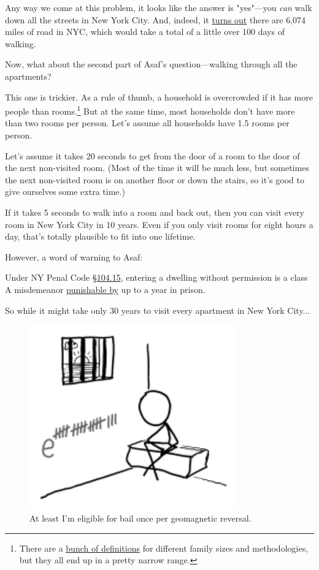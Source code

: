 {{Any way we come at this problem, it looks like the answer is "yes"—you \emph{can} walk down all the streets in New York City. And, indeed, it \href{http://www.nyslocalgov.org/pdf/HighwayServices.pdf}{turns out} there are 6,074 miles of road in NYC, which would take a total of a little over 100 days of walking.}

{Now, what about the second part of Asaf's question—walking through all the apartments?}

{This one is trickier. As a rule of thumb, a household is overcrowded if it has more people than rooms.{\footnote{There are a \href{http://www.huduser.org/publications/pdf/measuring\_overcrowding\_in\_hsg.pdf}{bunch of definitions} for different family sizes and methodologies, but they all end up in a pretty narrow range.} } But at the same time, most households don't have more than two rooms per person. Let's assume all households have 1.5 rooms per person.}

{Let's assume it takes 20 seconds to get from the door of a room to the door of the next non-visited room. (Most of the time it will be much less, but sometimes the next non-visited room is on another floor or down the stairs, so it's good to give ourselves some extra time.)}

{If it takes 5 seconds to walk into a room and back out, then you can visit every room in New York City in 10 years. Even if you only visit rooms for eight hours a day, that's totally plausible to fit into one lifetime.}

{However, a word of warning to Asaf:}

{Under NY Penal Code \href{http://ypdcrime.com/penal.law/article140.htm}{§104.15}, entering a dwelling without permission is a class A misdemeanor \href{http://www.criminaldefenselawyer.com/resources/new-york-misdemeanor-crimes-class-and-sentences.htm}{punishable by} up to a year in prison.}

{So while it might take only 30 years to visit every apartment in New York City...}

\begin{figure}[!htbp]
\centering
\includegraphics[scale=0.5, max width=0.8\textwidth]{imgs/a/110/jail.png}
\caption{At least I'm eligible for bail once per geomagnetic reversal.}
\end{figure}

}
